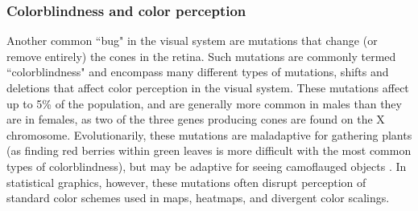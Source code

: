 \documentclass[11pt]{isuthesis}\usepackage[]{graphicx}\usepackage[]{color}
\begin{document}
\subsubsection{Colorblindness and color perception}\label{colorblindness}
Another common ``bug" in the visual system are mutations that change (or remove entirely) the cones in the retina. Such mutations are commonly termed ``colorblindness" and encompass many different types of mutations, shifts and deletions that affect color perception in the visual system. These mutations affect up to 5\% of the population, and are generally more common in males than they are in females, as two of the three genes producing cones are found on the X chromosome. Evolutionarily, these mutations are maladaptive for gathering plants (as finding red berries within green leaves is more difficult with the most common types of colorblindness), but may be adaptive for seeing camoflauged objects \citep{morgan1992dichromats}. In statistical graphics, however, these mutations often disrupt perception of standard color schemes used in maps, heatmaps, and divergent color scalings. 
% 
% 
\end{document}
